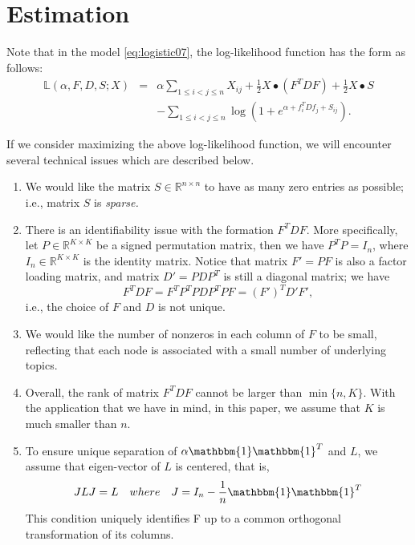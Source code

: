 \documentclass[AMS,STIX1COL]{WileyNJD-v2}
\begin{document}
\section{Estimation}
\label{sec:estimate}


Note that in the model \eqref{eq:logistic07}, the log-likelihood function has the form as follows:
\begin{eqnarray}
\label{eq:logistic08}
\mathbb{L}(\alpha,  F, D, S; X)
&=& \alpha \sum_{1\le i< j\le n}X_{ij} +\frac{1}{2} X \bullet (F^T D F) +\frac{1}{2} X \bullet S \\
&& -\sum_{1\le i<j\le n} \log \left(1 + e^{\alpha + f_i^T D f_j +S_{ij} }\right). \nonumber
\end{eqnarray}

If we consider maximizing the above log-likelihood function,
we will encounter several technical issues which are described below.
\begin{enumerate}
\item We would like the matrix $S \in \mathbb{R}^{n \times n}$ to have as many zero entries as possible; i.e., matrix $S$ is {\it sparse.}

\item There is an identifiability issue with the formation $F^T D F$.
More specifically, let $P \in \mathbb{R}^{K \times K}$ be a signed permutation matrix, then we have $P^T P = I_n$, where $I_n \in \mathbb{R}^{K \times K}$ is the identity matrix.
Notice that matrix $F' = PF$ is also a factor loading matrix, and
matrix $D' = P D P^T$ is still a diagonal matrix;
we have
$$
F^T D F = F^T P^T P D P^T P F = (F')^T D' F',
$$
i.e., the choice of $F$ and $D$ is not unique.

\item We would like the number of nonzeros in each column of $F$ to be small, reflecting that each node is associated with a small number of underlying topics.

\item Overall, the rank of matrix $F^T D F$ cannot be larger than $\min\{n,K\}$.
With the application that we have in mind, in this paper, we assume that $K$ is much smaller than $n$.

\item To ensure unique separation of $\alpha\mathbbm{1}\mathbbm{1}^T$ and $L$, we assume that eigen-vector of $L$ is centered, that is,
\[
    JLJ = L \quad where \quad
    J=I_{n}-\frac{1}{n}\mathbbm{1}\mathbbm{1}^T
\]
This condition uniquely identifies F up to a common orthogonal transformation of its columns.

\end{enumerate}
\end{document}
